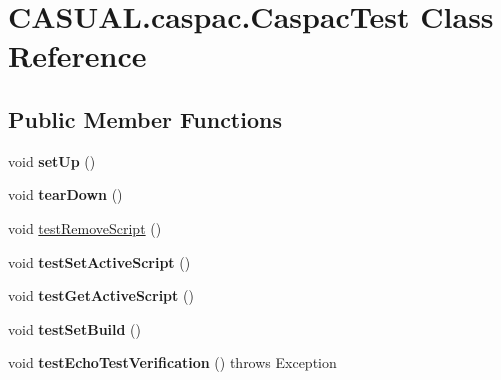 \hypertarget{class_c_a_s_u_a_l_1_1caspac_1_1_caspac_test}{\section{C\-A\-S\-U\-A\-L.\-caspac.\-Caspac\-Test Class Reference}
\label{class_c_a_s_u_a_l_1_1caspac_1_1_caspac_test}
}
\subsection*{Public Member Functions}
\begin{DoxyCompactItemize}
\item 
\hypertarget{class_c_a_s_u_a_l_1_1caspac_1_1_caspac_test_a6b7a7de2245a1ada8fa98a3b01bfd381}{void {\bfseries set\-Up} ()}\label{class_c_a_s_u_a_l_1_1caspac_1_1_caspac_test_a6b7a7de2245a1ada8fa98a3b01bfd381}

\item 
\hypertarget{class_c_a_s_u_a_l_1_1caspac_1_1_caspac_test_a99c80cb032c5c3d1eab471503f4d448c}{void {\bfseries tear\-Down} ()}\label{class_c_a_s_u_a_l_1_1caspac_1_1_caspac_test_a99c80cb032c5c3d1eab471503f4d448c}

\item 
void \hyperlink{class_c_a_s_u_a_l_1_1caspac_1_1_caspac_test_aaf1801c0e6b7492e34fae5e25a83f23c}{test\-Remove\-Script} ()
\item 
\hypertarget{class_c_a_s_u_a_l_1_1caspac_1_1_caspac_test_a056dc6cee1499f32fbc4dcde14c62557}{void {\bfseries test\-Set\-Active\-Script} ()}\label{class_c_a_s_u_a_l_1_1caspac_1_1_caspac_test_a056dc6cee1499f32fbc4dcde14c62557}

\item 
\hypertarget{class_c_a_s_u_a_l_1_1caspac_1_1_caspac_test_a4c2e5ad8b61d73f007534b58e1e80b54}{void {\bfseries test\-Get\-Active\-Script} ()}\label{class_c_a_s_u_a_l_1_1caspac_1_1_caspac_test_a4c2e5ad8b61d73f007534b58e1e80b54}

\item 
\hypertarget{class_c_a_s_u_a_l_1_1caspac_1_1_caspac_test_a7cbc2c75a5df1d2792affaa740f95e3f}{void {\bfseries test\-Set\-Build} ()}\label{class_c_a_s_u_a_l_1_1caspac_1_1_caspac_test_a7cbc2c75a5df1d2792affaa740f95e3f}

\item 
\hypertarget{class_c_a_s_u_a_l_1_1caspac_1_1_caspac_test_abe5ea7f10efe1f33733f9c43a8629864}{void {\bfseries test\-Echo\-Test\-Verification} ()  throws Exception }\label{class_c_a_s_u_a_l_1_1caspac_1_1_caspac_test_abe5ea7f10efe1f33733f9c43a8629864}


\end{DoxyCompactItemize}
